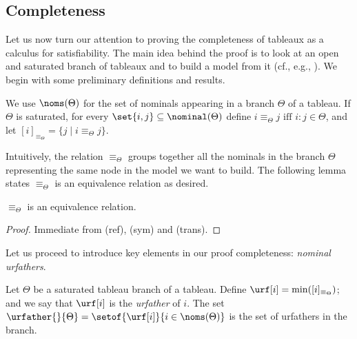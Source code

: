 \subsection{Completeness}\label{sec:completeness}

Let us now turn our attention to proving the completeness of tableaux as a calculus for satisfiability.
The main idea behind the proof is to look at an open and saturated branch of tableaux and to build a model from it (cf., e.g., \cite{Fit83,Fit96,Priest08}).
We begin with some preliminary definitions and results.


\begin{defi}
    \label{def:prefixrelation}
    We use $\noms(\Theta)$ for the set of nominals appearing in a branch $\Theta$ of a tableau. 
    If $\Theta$ is saturated, for every $\set{i,j} \subseteq \nominal(\Theta)$ define
    $i \equiv_\Theta j \mbox{ iff } i{:}j \in \Theta$, and let $[i]_{\equiv_{\Theta}} = \{ j \mid i \equiv_\Theta j\}$.
\end{defi}

Intuitively, the relation $\equiv_\Theta$ groups together all the nominals in the branch $\Theta$ representing the same node in the model we want to build.
The following lemma states $\equiv_\Theta$ is an equivalence relation as desired.

\begin{lem}
    \label{lemma:equiv-prefixrelation}
    $\equiv_\Theta$ is an equivalence relation.
\end{lem}
\begin{proof}
Immediate from (ref), (sym) and (trans).
\end{proof}

Let us proceed to introduce key elements in our proof completeness: \emph{nominal urfathers}.

\begin{defi}\label{def:urfather} 
    Let $\Theta$ be a saturated tableau branch of a tableau.
    Define $\urf[i]=\min([i]_{\equiv_{\Theta}})$; and we say that
$\urf[i]$ is the \emph{urfather} of $i$.
    The set $\urfather{}{\Theta} = \setof{\urf[i]}{i \in \noms(\Theta)}$ is the set of urfathers in the branch.
\end{defi}

